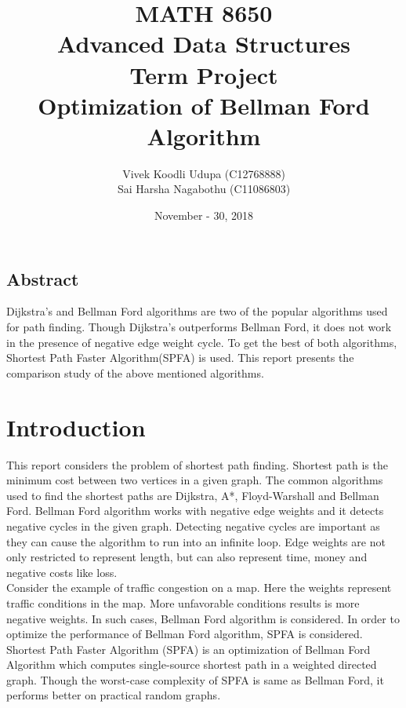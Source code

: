 \documentclass[12pt]{article}
\title{MATH 8650\\ Advanced Data Structures \\ 
	Term Project \\ Optimization of Bellman Ford Algorithm}
\author{Vivek Koodli Udupa (C12768888) \\ Sai Harsha Nagabothu (C11086803) }
\date{November - 30, 2018 }
\begin{document}
\begin{titlepage}
\maketitle
{}%
\end{titlepage}


\begin{center}
	\section*{Abstract}
\end{center}

Dijkstra's and Bellman Ford algorithms are two of the popular algorithms used for path finding. Though Dijkstra's outperforms Bellman Ford, it does not work in the presence of negative edge weight cycle. To get the best of both algorithms, Shortest Path Faster Algorithm(SPFA) is used. This report presents the comparison study of the above mentioned algorithms. \\

\section{Introduction}
This report considers the problem of shortest path finding. Shortest path is the minimum cost between two vertices in a  given graph. The common algorithms used to find the shortest paths are Dijkstra, A*, Floyd-Warshall and Bellman Ford. Bellman Ford algorithm works with negative edge weights and it detects negative cycles in the given graph. Detecting negative cycles are important as they can cause the algorithm to run into an infinite loop. Edge weights are not only restricted to represent length, but can also represent time, money and negative costs like loss. \\

Consider the example of traffic congestion on a map. Here the weights represent traffic conditions in the map. More unfavorable conditions results is more negative weights. In such cases, Bellman Ford algorithm is considered. In order to optimize the performance of Bellman Ford algorithm, SPFA is considered. \\ 

Shortest Path Faster Algorithm (SPFA) is an optimization of Bellman Ford Algorithm which computes single-source shortest path in a weighted directed graph. Though the worst-case complexity of SPFA is same as Bellman Ford, it performs better on practical random graphs. \\
\end{document}
